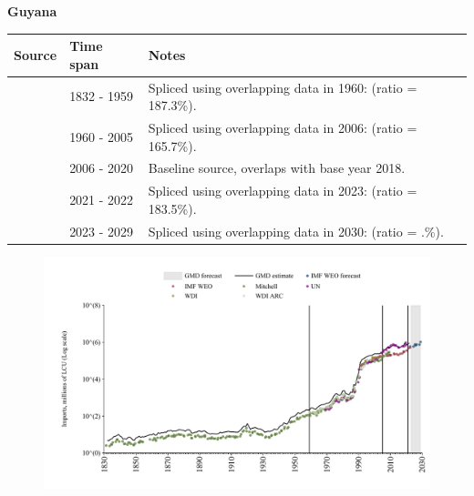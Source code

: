 \documentclass[12pt,a4paper,landscape]{article}
\begin{document}
\begin{adjustbox}{max totalsize={\paperwidth}{\paperheight},center}
\begin{minipage}[t][\textheight][t]{\textwidth}
\vspace*{0.5cm}
{}
\begin{center}
{\Large\bfseries Guyana}
\end{center}
\vspace{0.5cm}
\begin{table}[H]
\centering
\small
\begin{tabular}{|l|l|l|}
\hline
\textbf{Source} & \textbf{Time span} & \textbf{Notes} \\
\hline
\rowcolor{white}\cite{Mitchell}& 1832 - 1959 &Spliced using overlapping data in 1960: (ratio = 187.3\%).\\
\rowcolor{lightgray}\cite{WDI}& 1960 - 2005 &Spliced using overlapping data in 2006: (ratio = 165.7\%).\\
\rowcolor{white}\cite{UN}& 2006 - 2020 &Baseline source, overlaps with base year 2018.\\
\rowcolor{lightgray}\cite{IMF_WEO}& 2021 - 2022 &Spliced using overlapping data in 2023: (ratio = 183.5\%).\\
\rowcolor{white}\cite{IMF_WEO_forecast}& 2023 - 2029 &Spliced using overlapping data in 2030: (ratio = .\%).\\
\hline
\end{tabular}
\end{table}
\begin{figure}[H]
\centering
\includegraphics[width=\textwidth,height=0.6\textheight,keepaspectratio]{graphs/GUY_imports.pdf}
\end{figure}
\end{minipage}
\end{adjustbox}
\end{document}
